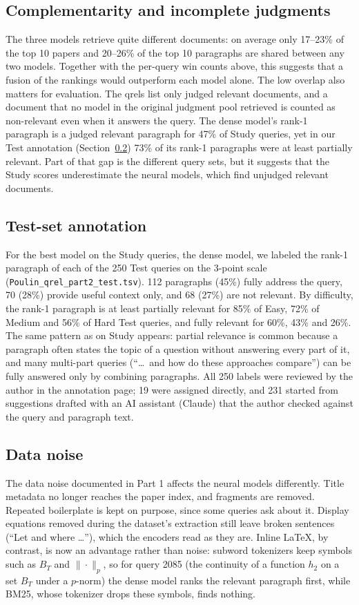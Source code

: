 \documentclass[sigconf,nonacm]{acmart}
\begin{document}
\subsection{Complementarity and incomplete judgments}
The three models retrieve quite different documents: on average only 17--23\% of the top 10 papers and 20--26\% of the top 10 paragraphs are shared between any two models. Together with the per-query win counts above, this suggests that a fusion of the rankings would outperform each model alone. The low overlap also matters for evaluation. The qrels list only judged relevant documents, and a document that no model in the original judgment pool retrieved is counted as non-relevant even when it answers the query. The dense model's rank-1 paragraph is a judged relevant paragraph for 47\% of Study queries, yet in our Test annotation (Section~\ref{sec:annotation}) 73\% of its rank-1 paragraphs were at least partially relevant. Part of that gap is the different query sets, but it suggests that the Study scores underestimate the neural models, which find unjudged relevant documents.

\subsection{Test-set annotation}
\label{sec:annotation}
For the best model on the Study queries, the dense model, we labeled the rank-1 paragraph of each of the 250 Test queries on the 3-point scale (\texttt{Poulin\_qrel\_part2\_test.tsv}). 112 paragraphs (45\%) fully address the query, 70 (28\%) provide useful context only, and 68 (27\%) are not relevant. By difficulty, the rank-1 paragraph is at least partially relevant for 85\% of Easy, 72\% of Medium and 56\% of Hard Test queries, and fully relevant for 60\%, 43\% and 26\%. The same pattern as on Study appears: partial relevance is common because a paragraph often states the topic of a question without answering every part of it, and many multi-part queries (``\ldots\ and how do these approaches compare'') can be fully answered only by combining paragraphs.
All 250 labels were reviewed by the author in the annotation page; 19 were assigned directly, and 231 started from suggestions drafted with an AI assistant (Claude) that the author checked against the query and paragraph text.

\subsection{Data noise}
The data noise documented in Part 1 affects the neural models differently. Title metadata no longer reaches the paper index, and fragments are removed. Repeated boilerplate is kept on purpose, since some queries ask about it. Display equations removed during the dataset's extraction still leave broken sentences (``Let and where \ldots''), which the encoders read as they are. Inline LaTeX, by contrast, is now an advantage rather than noise: subword tokenizers keep symbols such as $B_T$ and $\|\cdot\|_p$, so for query 2085 (the continuity of a function $h_2$ on a set $B_T$ under a $p$-norm) the dense model ranks the relevant paragraph first, while BM25, whose tokenizer drops these symbols, finds nothing.
\end{document}
